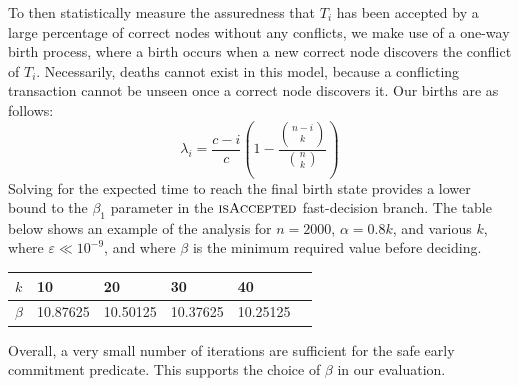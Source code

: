 \documentclass[letterpaper,twocolumn,10pt]{article}
\theoremstyle{definition}
\begin{document}
\begin{appendices}
To then statistically measure the assuredness that $T_i$ has been accepted by a large percentage of correct nodes without any conflicts, we make use of a one-way birth process, where a birth occurs when a new correct node discovers the conflict of $T_i$. Necessarily, deaths cannot exist in this model, because a conflicting transaction cannot be unseen once a correct node discovers it. 
Our births are as follows:
\begin{equation}
    \lambda_i = \frac{c - i}{c} \left(1 - \frac{{n - i \choose k}}{{n \choose k}}\right)
\end{equation}
Solving for the expected time to reach the final birth state provides a lower bound to the $\beta_1$ parameter in the $\textsc{isAccepted}$ fast-decision branch. The table below shows an example of the analysis for $n = 2000$, $\alpha = 0.8k$, and various $k$, where $\varepsilon \ll 10^{-9}$, and where $\beta$ is the minimum required value before deciding.
\begin{table}[h!]
    \small
	\centering
	\begin{tabular}{llllll}
		$k$   & 10 & 20 & 30 & 40 \\ \hline
		$\beta$ & 10.87625 & 10.50125 & 10.37625 & 10.25125
	\end{tabular}
	\label{table:fast-path-beta}
\end{table}
\noindent Overall, a very small number of iterations are sufficient for the safe early commitment predicate. This supports the choice of $\beta$ in our evaluation.


\end{appendices}
\end{document}
